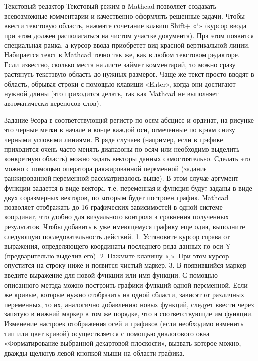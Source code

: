 Текстовый редактор
Текстовый режим в Mathcad позволяет создавать всевозможные комментарии и качественно оформлять решенные задачи.
Чтобы ввести текстовую область, нажмите сочетание клавиш Shift+ «‘» (курсор ввода при этом должен располагаться на чистом участке документа). При этом появится специальная рамка, а курсор ввода приобретет вид красной вертикальной линии.
Набирается текст в Mathcad точно так же, как в любом текстовом редакторе. Если известно, сколько места на листе займет комментарий, то можно сразу растянуть текстовую область до нужных размеров. Чаще же текст просто вводят в область, обрывая строки с помощью клавиши «Enter», когда они достигают нужной длины (это приходится делать, так как Mathcad не выполняет автоматически переносов слов).

Задание 9сора в соответствующий регистр по осям абсцисс и ординат, на рисунке это черные метки в начале и конце каждой оси, отмеченные по краям снизу черными угловыми линиями. 
В ряде случаев (например, если в графике приходится очень часто менять диапазоны по осям или необходимо выделить конкретную область) можно задать векторы данных самостоятельно. Сделать это можно с помощью оператора ранжированной переменной (задание ранжированной переменной рассматривалось выше). В этом случае аргумент функции задается в виде вектора, т.е. переменная и функция будут заданы в виде двух соразмерных векторов, по которым будет построен график.
Mathcad позволяет отображать до 16 графических зависимостей в одной системе координат, что удобно для визуального контроля и сравнения полученных результатов. Чтобы добавить к уже имеющемуся графику еще один, выполните следующую последовательность действий.
1. Установите курсор справа от выражения, определяющего координаты последнего ряда данных по оси Y (предварительно выделив его).
2. Нажмите клавишу «,». При этом курсор опустится на строку ниже и появится чистый маркер.
3. В появившийся маркер введите выражение для новой функции или имя функции.
С помощью описанного метода можно построить графики функций одной переменной. Если же кривые, которые нужно отобразить на одной области, зависят от различных переменных, то их, аналогично добавлению новых функций, следует ввести через запятую в нижний маркер в том же порядке, что и соответствующие им функции.
Изменение настроек отображения осей и графиков (если необходимо изменить тип или цвет кривой) осуществляется с помощью диалогового окна «Форматирование выбранной декартовой плоскости», вызвать которое можно, дважды щелкнув левой кнопкой мыши на области графика.

